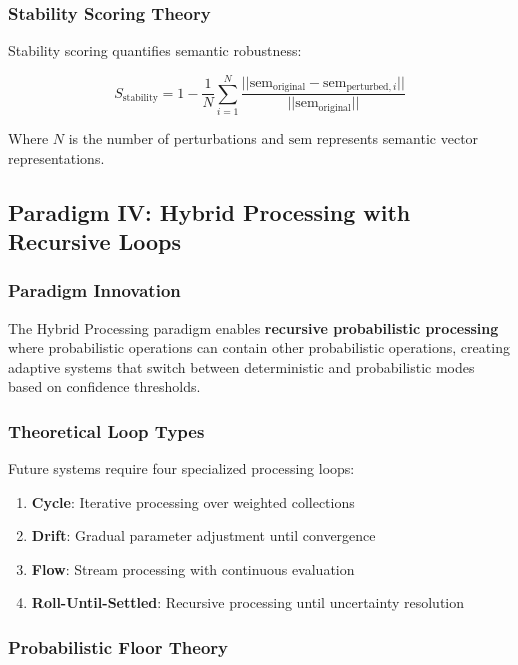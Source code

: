 \documentclass[12pt,a4paper,twoside]{article}
\begin{document}
\subsubsection{Stability Scoring Theory}

Stability scoring quantifies semantic robustness:

\begin{equation}
S_{\text{stability}} = 1 - \frac{1}{N} \sum_{i=1}^{N} \frac{||\text{sem}_{\text{original}} - \text{sem}_{\text{perturbed},i}||}{||\text{sem}_{\text{original}}||}
\end{equation}

Where $N$ is the number of perturbations and $\text{sem}$ represents semantic vector representations.

\subsection{Paradigm IV: Hybrid Processing with Recursive Loops}

\subsubsection{Paradigm Innovation}

The Hybrid Processing paradigm enables \textbf{recursive probabilistic processing} where probabilistic operations can contain other probabilistic operations, creating adaptive systems that switch between deterministic and probabilistic modes based on confidence thresholds.

\subsubsection{Theoretical Loop Types}

Future systems require four specialized processing loops:

\begin{enumerate}
\item \textbf{Cycle}: Iterative processing over weighted collections
\item \textbf{Drift}: Gradual parameter adjustment until convergence
\item \textbf{Flow}: Stream processing with continuous evaluation
\item \textbf{Roll-Until-Settled}: Recursive processing until uncertainty resolution
\end{enumerate}

\subsubsection{Probabilistic Floor Theory}
\end{document}
